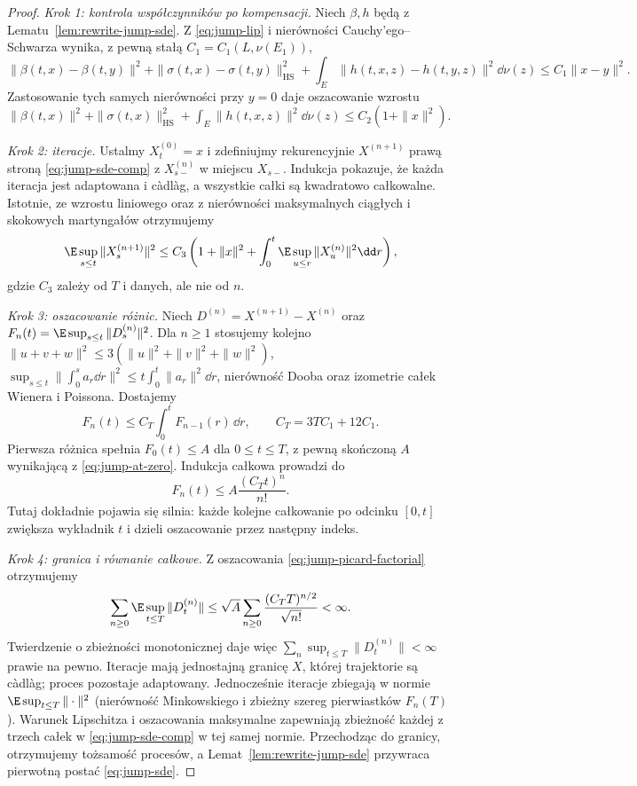 \begin{proof}
\emph{Krok 1: kontrola współczynników po kompensacji.}
Niech $\beta,h$ będą z Lematu~\ref{lem:rewrite-jump-sde}.
Z \eqref{eq:jump-lip} i nierówności Cauchy'ego--Schwarza
wynika, z pewną stałą $C_1=C_1(L,\nu(E_1))$,
\[
\|\beta(t,x)-\beta(t,y)\|^2
+\|\sigma(t,x)-\sigma(t,y)\|_{\mathrm{HS}}^2
+\int_E\|h(t,x,z)-h(t,y,z)\|^2\dd\nu(z)
\le C_1\|x-y\|^2.
\]
Zastosowanie tych samych nierówności przy $y=0$ daje
oszacowanie wzrostu
$\|\beta(t,x)\|^2+\|\sigma(t,x)\|_{\mathrm{HS}}^2+
\int_E\|h(t,x,z)\|^2\dd\nu(z)
\le C_2(1+\|x\|^2)$.

\emph{Krok 2: iteracje.} Ustalmy $X^{(0)}_t=x$ i
zdefiniujmy rekurencyjnie $X^{(n+1)}$ prawą stroną
\eqref{eq:jump-sde-comp} z $X^{(n)}_{s-}$ w miejscu $X_{s-}$.
Indukcja pokazuje, że każda iteracja jest adaptowana i càdlàg,
a wszystkie całki są kwadratowo całkowalne. Istotnie,
ze wzrostu liniowego oraz z nierówności maksymalnych
ciągłych i skokowych martyngałów otrzymujemy
\[
\E\sup_{s\le t}\|X^{(n+1)}_s\|^2
\le C_3\left(1+\|x\|^2+
 \int_0^t\E\sup_{u\le r}\|X^{(n)}_u\|^2\dd r\right),
\]
gdzie $C_3$ zależy od $T$ i danych, ale nie od $n$.

\emph{Krok 3: oszacowanie różnic.} Niech
$D^{(n)}=X^{(n+1)}-X^{(n)}$ oraz
$F_n(t)=\E\sup_{s\le t}\|D^{(n)}_s\|^2$.
Dla $n\ge1$ stosujemy kolejno
$\|u+v+w\|^2\le3(\|u\|^2+\|v\|^2+\|w\|^2)$,
$\sup_{s\le t}\|\int_0^s a_r\dd r\|^2
\le t\int_0^t\|a_r\|^2\dd r$, nierówność Dooba
oraz izometrie całek Wienera i Poissona. Dostajemy
\[
 F_n(t)\le C_T\int_0^t F_{n-1}(r)\,\dd r,
 \qquad C_T=3TC_1+12C_1.
 \tag{13.5}\label{eq:jump-picard-est}
\]
Pierwsza różnica spełnia $F_0(t)\le A$ dla $0\le t\le T$,
z pewną skończoną $A$ wynikającą z \eqref{eq:jump-at-zero}.
Indukcja całkowa prowadzi do
\[
 F_n(t)\le A\frac{(C_Tt)^n}{n!}.
 \tag{13.6}\label{eq:jump-picard-factorial}
\]
Tutaj dokładnie pojawia się silnia: każde kolejne
całkowanie po odcinku $[0,t]$ zwiększa wykładnik $t$
i dzieli oszacowanie przez następny indeks.

\emph{Krok 4: granica i równanie całkowe.} Z oszacowania
\eqref{eq:jump-picard-factorial} otrzymujemy
\[
\sum_{n\ge0}\E\sup_{t\le T}\|D^{(n)}_t\|
\le \sqrt A\sum_{n\ge0}\frac{(C_TT)^{n/2}}{\sqrt{n!}}<\infty.
\]
Twierdzenie o zbieżności monotonicznej daje więc
$\sum_n\sup_{t\le T}\|D^{(n)}_t\|<\infty$ prawie na pewno.
Iteracje mają jednostajną granicę $X$, której trajektorie
są càdlàg; proces pozostaje adaptowany.
Jednocześnie iteracje zbiegają w normie
$\E\sup_{t\le T}\|\cdot\|^2$ (nierówność Minkowskiego
i zbieżny szereg pierwiastków $F_n(T)$).
Warunek Lipschitza i oszacowania maksymalne zapewniają
zbieżność każdej z trzech całek w \eqref{eq:jump-sde-comp}
w tej samej normie. Przechodząc do granicy, otrzymujemy
tożsamość procesów, a Lemat~\ref{lem:rewrite-jump-sde}
przywraca pierwotną postać \eqref{eq:jump-sde}.


\end{proof}
